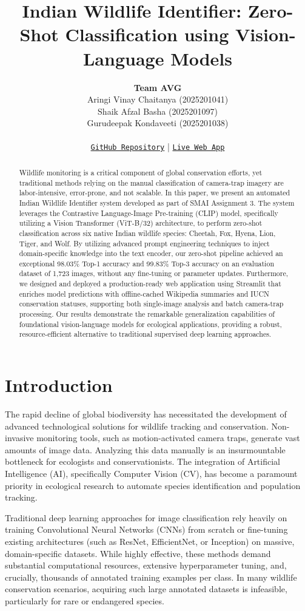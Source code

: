 \documentclass[11pt]{article}
\title{Indian Wildlife Identifier: Zero-Shot Classification using Vision-Language Models}
\author{
  \textbf{Team AVG} \\
  Aringi Vinay Chaitanya (2025201041) \\
  Shaik Afzal Basha (2025201097) \\
  Gurudeepak Kondaveeti (2025201038) \\
  \vspace{0.2cm} \\
  \texttt{\href{https://github.com/Vinaychaitanya001/smai_assignment3}{GitHub Repository}} \quad | \quad \texttt{\href{https://bigcats.streamlit.app/}{Live Web App}}
}
\begin{document}
\maketitle

\begin{abstract}
Wildlife monitoring is a critical component of global conservation efforts, yet traditional methods relying on the manual classification of camera-trap imagery are labor-intensive, error-prone, and not scalable. In this paper, we present an automated Indian Wildlife Identifier system developed as part of SMAI Assignment 3. The system leverages the Contrastive Language-Image Pre-training (CLIP) model, specifically utilizing a Vision Transformer (ViT-B/32) architecture, to perform zero-shot classification across six native Indian wildlife species: Cheetah, Fox, Hyena, Lion, Tiger, and Wolf. By utilizing advanced prompt engineering techniques to inject domain-specific knowledge into the text encoder, our zero-shot pipeline achieved an exceptional 98.03\% Top-1 accuracy and 99.83\% Top-3 accuracy on an evaluation dataset of 1,723 images, without any fine-tuning or parameter updates. Furthermore, we designed and deployed a production-ready web application using Streamlit that enriches model predictions with offline-cached Wikipedia summaries and IUCN conservation statuses, supporting both single-image analysis and batch camera-trap processing. Our results demonstrate the remarkable generalization capabilities of foundational vision-language models for ecological applications, providing a robust, resource-efficient alternative to traditional supervised deep learning approaches.
\end{abstract}

\section{Introduction}

The rapid decline of global biodiversity has necessitated the development of advanced technological solutions for wildlife tracking and conservation. Non-invasive monitoring tools, such as motion-activated camera traps, generate vast amounts of image data. Analyzing this data manually is an insurmountable bottleneck for ecologists and conservationists. The integration of Artificial Intelligence (AI), specifically Computer Vision (CV), has become a paramount priority in ecological research to automate species identification and population tracking.

Traditional deep learning approaches for image classification rely heavily on training Convolutional Neural Networks (CNNs) from scratch or fine-tuning existing architectures (such as ResNet, EfficientNet, or Inception) on massive, domain-specific datasets. While highly effective, these methods demand substantial computational resources, extensive hyperparameter tuning, and, crucially, thousands of annotated training examples per class. In many wildlife conservation scenarios, acquiring such large annotated datasets is infeasible, particularly for rare or endangered species.
\end{document}
